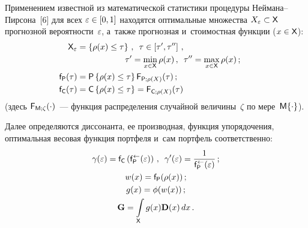 \begin{multicols}{2}
  Применением известной из математической статистики процедуры 
  Ней\-ма\-на--Пир\-со\-на~[6] для всех $\varepsilon\hm\in [0, 1]$ находятся 
оптимальные множества $X_\varepsilon\hm\subset {\sf X}$ прогнозной 
вероятности~$\varepsilon$, а~также прогнозная и~стоимостная функции 
($x\hm\in{\sf X}$): 
  \begin{align*}
 \hspace*{-15mm}{\sf X}_\varepsilon &=\left\{ \rho(x)\leq \tau\right\}\,,\enskip \tau\in \left[ 
\tau^\prime, \tau^{\prime\prime}\right]\,,\\
  &\hspace*{20mm}\tau^\prime=\min\limits_{x\in{\sf X}} \rho(x)\,,\enskip 
\tau^{\prime\prime}=\max\limits_{x\in{\sf X}} \rho(x)\,;\\
   \hspace*{-5mm}{\sf f}_{\sf P} (\tau) &= {\sf P}\left\{ \rho(x)\leq\tau\right\} {\sf F}_{{\sf 
P};\rho(X)}(\tau)\,;\\ 
 \hspace*{-5mm}{\sf f}_{\sf C}(\tau) &={\sf C} \left\{ \rho(x)\leq\tau\right\} 
= {\sf F}_{{\sf C};\rho(X)}(\tau)
  \end{align*}
 (здесь ${\sf F}_{{\sf M};\zeta}(\cdot)$~--- функция распределения случайной 
величины~$\zeta$ по мере~${\sf M}\{\cdot\}$). 
  
  Далее определяются диссонанта, ее производная, функция упорядочения, 
оптимальная весовая функция портфеля и~сам портфель соответственно:
  \begin{gather*}
  \gamma(\varepsilon) ={\sf f}_{{\sf C}} \left( {\sf f}_{\sf 
P}^{\leftarrow}(\varepsilon)\right)\,,\enskip \gamma^\prime(\varepsilon) 
=\displaystyle\frac{\displaystyle 1\mathstrut}{\displaystyle {\sf f}_{\sf P}^{\leftarrow}(\varepsilon)\mathstrut}\,;\\
  w(x)={\sf f}_{{\sf P}} (\rho(x))\,;\\
   g(x)=\phi(w(x))\,;\\
 \mathbf{G}=\int\limits_{\sf X} 
g(x)\mathbf{D}(x)\,dx\,.
  \end{gather*}
  

\end{multicols}
